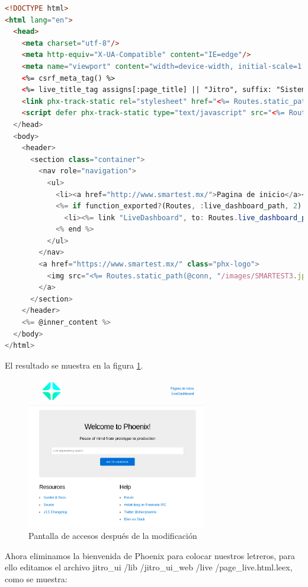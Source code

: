 \begin{lstlisting}[language=html]
<!DOCTYPE html>
<html lang="en">
  <head>
    <meta charset="utf-8"/>
    <meta http-equiv="X-UA-Compatible" content="IE=edge"/>
    <meta name="viewport" content="width=device-width, initial-scale=1.0"/>
    <%= csrf_meta_tag() %>
    <%= live_title_tag assigns[:page_title] || "Jitro", suffix: "Sistema de acceso" %>
    <link phx-track-static rel="stylesheet" href="<%= Routes.static_path(@conn, "/css/app.css") %>"/>
    <script defer phx-track-static type="text/javascript" src="<%= Routes.static_path(@conn, "/js/app.js") %>"></script>
  </head>
  <body>
    <header>
      <section class="container">
        <nav role="navigation">
          <ul>
            <li><a href="http://www.smartest.mx/">Pagina de inicio</a></li>
            <%= if function_exported?(Routes, :live_dashboard_path, 2) do %>
              <li><%= link "LiveDashboard", to: Routes.live_dashboard_path(@conn, :home) %></li>
            <% end %>
          </ul>
        </nav>
        <a href="https://www.smartest.mx/" class="phx-logo">
          <img src="<%= Routes.static_path(@conn, "/images/SMARTEST3.jpg") %>" alt="Logo SMARTEST"/>
        </a>
      </section>
    </header>
    <%= @inner_content %>
  </body>
</html>
\end{lstlisting}

El resultado se muestra en la figura \ref{cap2:003}.
\begin{figure}[htb]
\centering
\includegraphics[width=0.7\textwidth]{capitulo2/primeraPantalla.png}
\caption{Pantalla de accesos después de la modificación}
\label{cap2:003}
\end{figure}

Ahora eliminamos la bienvenida de Phoenix para colocar nuestros letreros, para ello editamos el archivo jitro\_ui /lib /jitro\_ui\_web /live /page\_live.html.leex, como se muestra:


